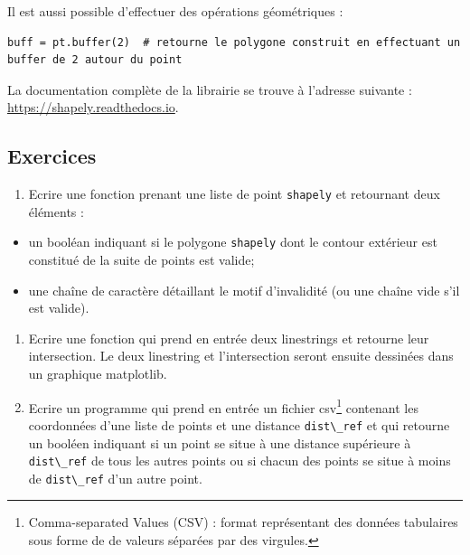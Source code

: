 \documentclass[11pt]{article}
\newcommand{\passthrough}[1]{#1}
\def\tightlist{}
\begin{document}
Il est aussi possible d'effectuer des opérations géométriques :

\begin{lstlisting}
buff = pt.buffer(2)  # retourne le polygone construit en effectuant un buffer de 2 autour du point
\end{lstlisting}

La documentation complète de la librairie se trouve à l'adresse suivante
: \url{https://shapely.readthedocs.io}.

\hypertarget{exercices}{%
\subsection{Exercices}\label{exercices}}

\begin{enumerate}
\def\labelenumi{\arabic{enumi}.}
\tightlist
\item
  Ecrire une fonction prenant une liste de point
  \passthrough{\lstinline!shapely!} et retournant deux éléments :
\end{enumerate}

\begin{itemize}
\tightlist
\item
  un booléan indiquant si le polygone \passthrough{\lstinline!shapely!}
  dont le contour extérieur est constitué de la suite de points est
  valide;
\item
  une chaîne de caractère détaillant le motif d'invalidité (ou une
  chaîne vide s'il est valide).
\end{itemize}

\begin{enumerate}
\def\labelenumi{\arabic{enumi}.}
\setcounter{enumi}{1}
\tightlist
\item
  Ecrire une fonction qui prend en entrée deux linestrings et retourne
  leur intersection. Le deux linestring et l'intersection seront ensuite
  dessinées dans un graphique matplotlib.
\item
  Ecrire un programme qui prend en entrée un fichier csv\footnote{Comma-separated
    Values (CSV) : format représentant des données tabulaires sous forme
    de de valeurs séparées par des virgules.} contenant les coordonnées
  d'une liste de points et une distance
  \passthrough{\lstinline!dist\_ref!} et qui retourne un booléen
  indiquant si un point se situe à une distance supérieure à
  \passthrough{\lstinline!dist\_ref!} de tous les autres points ou si
  chacun des points se situe à moins de
  \passthrough{\lstinline!dist\_ref!} d'un autre point.
\end{enumerate}
\end{document}
